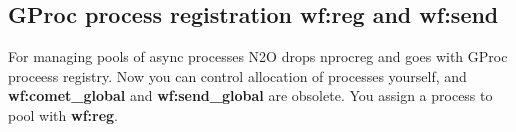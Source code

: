 \documentclass[11pt]{article}
\begin{document}
\subsection*{GProc process registration {\bf wf:reg} and {\bf wf:send}}
For managing pools of async processes N2O drops nprocreg and goes with GProc proceess registry.
Now you can control allocation of processes yourself,
and {\bf wf:comet\_global} and {\bf wf:send_global} are obsolete.
You assign a process to pool with {\bf wf:reg}.







\end{document}
